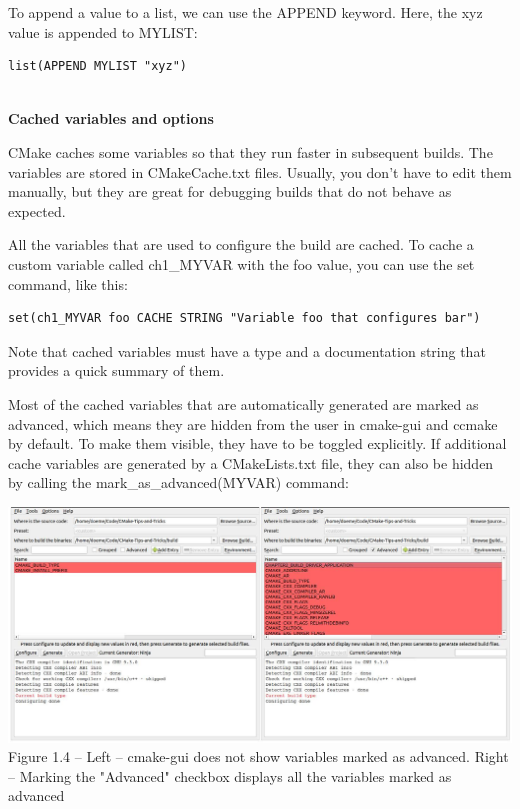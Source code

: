 To append a value to a list, we can use the APPEND keyword. Here, the xyz value is appended to MYLIST:

\begin{lstlisting}[style=styleCMake]
list(APPEND MYLIST "xyz")
\end{lstlisting}

\hspace*{\fill} \\ %
\noindent
\textbf{Cached variables and options}

CMake caches some variables so that they run faster in subsequent builds. The variables are stored in CMakeCache.txt files. Usually, you don't have to edit them manually, but they are great for debugging builds that do not behave as expected. 

All the variables that are used to configure the build are cached. To cache a custom variable called ch1\_MYVAR with the foo value, you can use the set command, like this:

\begin{lstlisting}[style=styleCMake]
set(ch1_MYVAR foo CACHE STRING "Variable foo that configures bar")
\end{lstlisting}

Note that cached variables must have a type and a documentation string that provides
a quick summary of them.

Most of the cached variables that are automatically generated are marked as advanced, which means they are hidden from the user in cmake-gui and ccmake by default. To make them visible, they have to be toggled explicitly. If additional cache variables are generated by a CMakeLists.txt file, they can also be hidden by calling the mark\_as\_advanced(MYVAR) command:

\begin{center}
\includegraphics[width=1.\textwidth]{content/1/chapter1/images/4.jpg}\\
Figure 1.4 – Left – cmake-gui does not show variables marked as advanced. Right – Marking the "Advanced" checkbox displays all the variables marked as advanced
\end{center}

